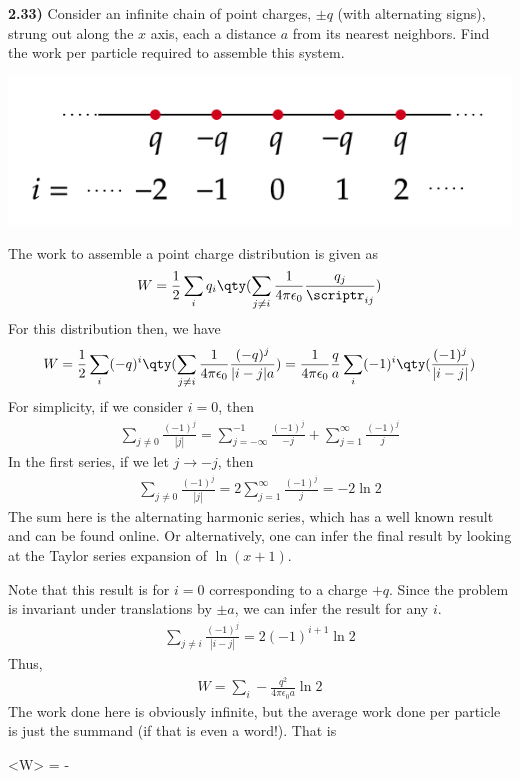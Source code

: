 \documentclass[12pt,a4paper]{article}
\newcommand{\prob}[2]{\textbf{#1)} #2}
\begin{document}
\prob{2.33}{Consider an infinite chain of point charges, $\pm q$ (with alternating signs), strung out along the $x$ axis, each a distance $a$ from its nearest neighbors. Find the work per particle required to assemble this system.}

\bef
\includegraphics[scale=0.5]{fig1.png}
\eef

The work to assemble a point charge distribution is given as
\begin{align*}
W = \frac{1}{2}\sum_{i}q_i\qty(\sum_{j \not= i} \frac{1}{4\pi\epsilon_0}\frac{q_j}{\scriptr_{ij}})
\end{align*}
For this distribution then, we have
\begin{align*}
W = \frac{1}{2}\sum_{i}(-q)^{i}\qty(\sum_{j \not= i} \frac{1}{4\pi\epsilon_0}\frac{(-q)^{j}}{|i-j|a}) = \frac{1}{4\pi\epsilon_0}\frac{q}{a}\sum_{i} (-1)^{i}\qty(\frac{(-1)^{j}}{|i-j|})
\end{align*}
For simplicity, if we consider $i = 0$, then
\begin{align*}
\sum_{j \not= 0} \frac{(-1)^{j}}{|j|} = \sum_{j=-\infty}^{-1} \frac{(-1)^{j}}{-j} + \sum_{j=1}^{\infty} \frac{(-1)^{j}}{j}
\end{align*}
In the first series, if we let $j \rightarrow -j$, then
\begin{align*}
\sum_{j \not= 0} \frac{(-1)^{j}}{|j|} = 2\sum_{j=1}^{\infty} \frac{(-1)^j}{j} = -2\ln{2}
\end{align*}
The sum here is the alternating harmonic series, which has a well known result and can be found online. Or alternatively, one can infer the final result by looking at the Taylor series expansion of $\ln(x+1)$.

Note that this result is for $i = 0$ corresponding to a charge $+q$. Since the problem is invariant under translations by $\pm a$, we can infer the result for any $i$.
\begin{align*}
\sum_{j \not= i} \frac{(-1)^{j}}{|i-j|} = 2(-1)^{i+1}\ln{2}
\end{align*}
Thus,
\begin{align*}
W = \sum_{i} -\frac{q^2}{4\pi\epsilon_0a}\ln{2}
\end{align*}
The work done here is obviously infinite, but the average work done per particle is just the summand (if that is even a word!). That is
\begin{eqbox}
\left<W\right> = -
\end{eqbox}
\end{document}
